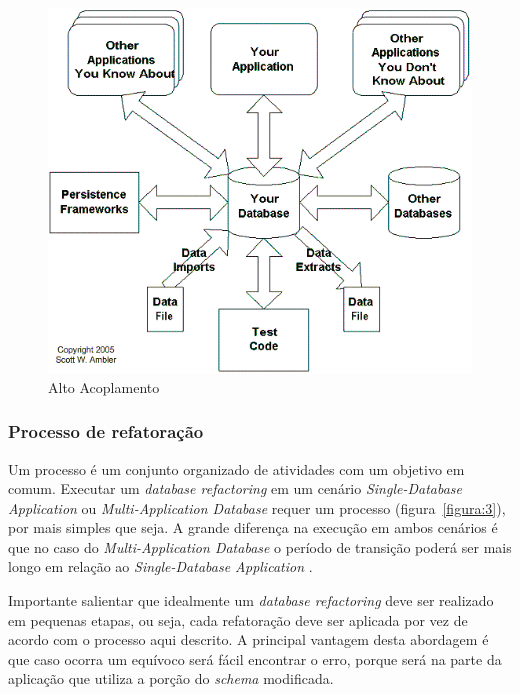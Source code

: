 \documentclass[10pt]{article}
\begin{document}
	\begin{figure}[ht]
		\centering
		\includegraphics[width=.5\textwidth]{img/dataRefactoringWorstCase.png}
		\caption{Alto Acoplamento}
		\label{figura:2}
	\end{figure}

	
\subsubsection{Processo de refatoração}\label{subsec:processorefatoracao}
	Um processo é um conjunto organizado de atividades com um objetivo em comum. Executar um \textit{database refactoring} em um cenário \textit{Single-Database Application} ou \textit{Multi-Application Database} requer um processo (figura~\ref{figura:3}), por mais simples que seja. A grande diferença na execução em ambos cenários é que no caso do \textit{Multi-Application Database} o período de transição poderá ser mais longo em relação ao \textit{Single-Database Application} \cite{Ambler:RefactoringDatabases}.

    Importante salientar que idealmente um \textit{database refactoring} deve ser realizado em pequenas etapas, ou seja, cada refatoração deve ser aplicada por vez de acordo com o processo aqui descrito. A principal vantagem desta abordagem é que caso ocorra um equívoco será fácil encontrar o erro, porque será na parte da aplicação que utiliza a porção do \textit{schema} modificada.
\end{document}

